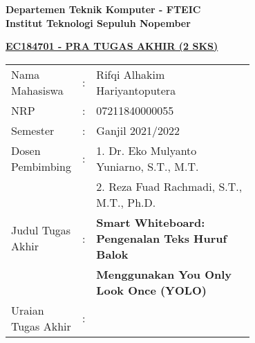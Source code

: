 \begin{flushleft}
    \textbf{Departemen Teknik Komputer - FTEIC}\\
    \textbf{Institut Teknologi Sepuluh Nopember}\\
  \end{flushleft}
  
  \begin{center}
    \underline{\textbf{EC184701 - PRA TUGAS AKHIR (2 SKS)}}
  \end{center}
  
  \begin{adjustwidth}{-0.2cm}{}
    \begin{tabular}{lcp{0.7\linewidth}}
  
      Nama Mahasiswa &:& Rifqi Alhakim Hariyantoputera \\
      NRP &:& 07211840000055 \\
  
      Semester &:& Ganjil 2021/2022 \\
  
      Dosen Pembimbing &:& 1. Dr. Eko Mulyanto Yuniarno, S.T., M.T. \\
      & & 2. Reza Fuad Rachmadi, S.T., M.T., Ph.D. \\
  
      Judul Tugas Akhir &:& \textbf{Smart Whiteboard: Pengenalan Teks Huruf Balok } \\
      & & \textbf{Menggunakan You Only Look Once (YOLO)} \\
  
      Uraian Tugas Akhir &:& \\
    \end{tabular}
  \end{adjustwidth}
  
